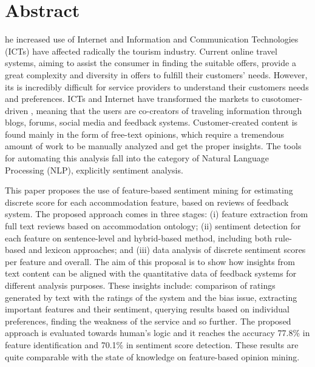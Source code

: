 %
%
%
\let\cleardoublepage\clearpage
\chapter{Abstract}
\begin{SingleSpace}
he increased use of Internet and Information and Communication Technologies (ICTs) have affected radically the tourism industry. Current online travel systems, aiming to assist the consumer in finding the suitable offers, provide a great complexity and diversity in offers to fulfill their customers' needs. However, its is incredibly difficult for service providers to understand their customers needs and preferences. ICTs and Internet have transformed the markets to cusotomer-driven \cite{buhalis2011tourism}, meaning that the users are co-creators of traveling information through blogs, forums, social media and feedback systems.  Customer-created content is found mainly in the form of free-text opinions, which require a tremendous amount of work to be manually analyzed and get the proper insights. The tools for automating this analysis fall into the category of Natural Language Processing (NLP), explicitly sentiment analysis. 

This paper proposes the use of feature-based sentiment mining for estimating discrete score for each accommodation feature, based on reviews of feedback system. The proposed approach comes in three stages: (i) feature extraction from full text reviews based on accommodation ontology; (ii) sentiment detection for each feature on sentence-level and hybrid-based method, including both rule-based and lexicon approaches; and (iii) data analysis of discrete sentiment scores per feature and overall. The aim of this proposal is to show how insights from text content can be aligned with the quantitative data of feedback systems for different analysis purposes. These insights include: comparison of ratings generated by text with the ratings of the system and the bias issue, extracting important features and their sentiment, querying results based on individual preferences, finding the weakness of the service and so further. The proposed approach is evaluated towards human's logic and it reaches the accuracy 77.8\% in feature identification and 70.1\% in sentiment score detection. These results are quite comparable with the state of knowledge on feature-based opinion mining.
\end{SingleSpace}
\clearpage